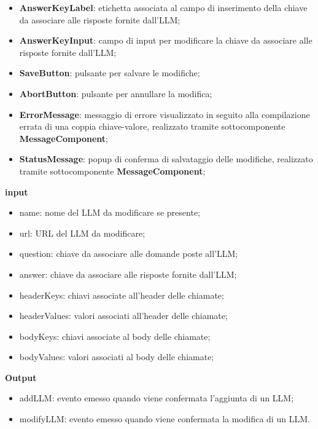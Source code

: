 \begin{itemize}
    \item \textbf{AnswerKeyLabel}: etichetta associata al campo di inserimento della chiave da associare alle risposte fornite dall'LLM;
    \item \textbf{AnswerKeyInput}: campo di input per modificare la chiave da associare alle risposte fornite dall'LLM;
    \item \textbf{SaveButton}: pulsante per salvare le modifiche;
    \item \textbf{AbortButton}: pulsante per annullare la modifica;
    \item \textbf{ErrorMessage}: messaggio di errore visualizzato in seguito alla compilazione errata di una coppia chiave-valore, realizzato tramite sottocomponente \textbf{MessageComponent};
    \item \textbf{StatusMessage}: popup di conferma di salvataggio delle modifiche, realizzato tramite sottocomponente \textbf{MessageComponent};
\end{itemize}
\textbf{input}
\begin{itemize}
    \item name: nome del LLM da modificare se presente; 
    \item url: URL del LLM da modificare;
    \item question: chiave da associare alle domande poste all'LLM;
    \item answer: chiave da associare alle risposte fornite dall'LLM;
    \item headerKeys: chiavi associate all'header delle chiamate;
    \item headerValues: valori associati all'header delle chiamate;
    \item bodyKeys: chiavi associate al body delle chiamate;
    \item bodyValues: valori associati al body delle chiamate;
\end{itemize}
\textbf{Output}
\begin{itemize}
    \item addLLM: evento emesso quando viene confermata l'aggiunta di un LLM;
    \item modifyLLM: evento emesso quando viene confermata la modifica di un LLM.
\end{itemize}